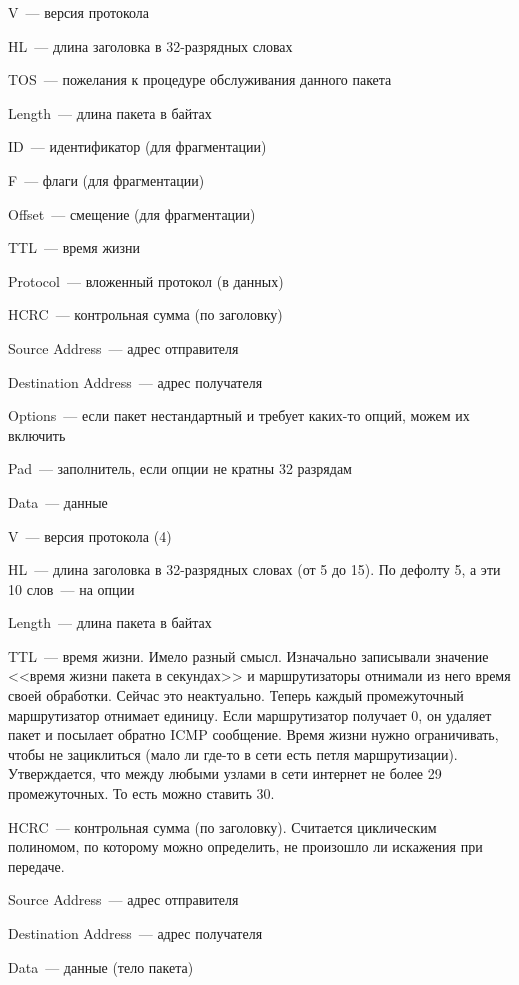 \begin{MyItemize}
    \item V~--- версия протокола
    \item HL~--- длина заголовка в 32-разрядных словах
    \item TOS~--- пожелания к процедуре обслуживания данного пакета
    \item Length~--- длина пакета в байтах
    \item ID~--- идентификатор (для фрагментации)
    \item F~--- флаги (для фрагментации)
    \item Offset~--- смещение (для фрагментации)
    \item TTL~--- время жизни
    \item Protocol~--- вложенный протокол (в данных)
    \item HCRC~--- контрольная сумма (по заголовку)
    \item Source Address~--- адрес отправителя
    \item Destination Address~--- адрес получателя
    \item Options~--- если пакет нестандартный и требует каких-то опций, можем их включить
    \item Pad~--- заполнитель, если опции не кратны 32 разрядам
    \item Data~--- данные
\end{MyItemize}


\begin{MyItemize}
    \item V~--- версия протокола (4)
    \item HL~--- длина заголовка в 32-разрядных словах (от 5 до 15). По дефолту 5, а эти 10 слов~--- на опции
    \item Length~--- длина пакета в байтах
    \item TTL~--- время жизни. Имело разный смысл. Изначально записывали значение <<время жизни пакета в секундах>> и маршрутизаторы отнимали из него время своей обработки. Сейчас это неактуально. Теперь каждый промежуточный маршрутизатор отнимает единицу. Если маршрутизатор получает 0, он удаляет пакет и посылает обратно ICMP сообщение. Время жизни нужно ограничивать, чтобы не зациклиться (мало ли где-то в сети есть петля маршрутизации). Утверждается, что между любыми узлами в сети интернет не более 29 промежуточных. То есть можно ставить 30.
    \item HCRC~--- контрольная сумма (по заголовку). Считается циклическим полиномом, по которому можно определить, не произошло ли искажения при передаче.
    \item Source Address~--- адрес отправителя
    \item Destination Address~--- адрес получателя
    \item Data~--- данные (тело пакета)
\end{MyItemize}

